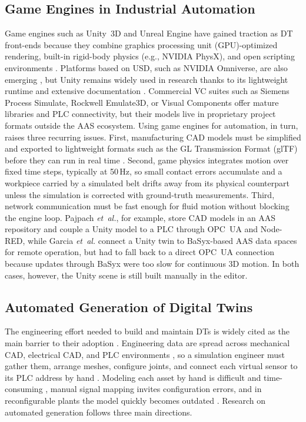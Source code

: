 \documentclass{ieeeojies}
\newcommand{\etal}{\textit{et~al.}}
\begin{document}
\subsection{Game Engines in Industrial Automation}
\label{sec:rw_game_engines}

Game engines such as Unity~3D and Unreal Engine have gained traction as DT front-ends because they combine graphics processing unit (GPU)-optimized rendering, built-in rigid-body physics (e.g., NVIDIA PhysX), and open scripting environments \cite{Zheng2024,Pajpach2022,Garcia2025}. Platforms based on USD, such as NVIDIA Omniverse, are also emerging \cite{Dong2024}, but Unity remains widely used in research thanks to its lightweight runtime and extensive documentation \cite{Alexopoulos2025,Pajpach2023}. Commercial VC suites such as Siemens Process Simulate, Rockwell Emulate3D, or Visual Components offer mature libraries and PLC connectivity, but their models live in proprietary project formats outside the AAS ecosystem. Using game engines for automation, in turn, raises three recurring issues. First, manufacturing CAD models must be simplified and exported to lightweight formats such as the GL Transmission Format (glTF) before they can run in real time \cite{Chowdhury2025,Striffler2023}. Second, game physics integrates motion over fixed time steps, typically at 50\,Hz, so small contact errors accumulate and a workpiece carried by a simulated belt drifts away from its physical counterpart unless the simulation is corrected with ground-truth measurements. Third, network communication must be fast enough for fluid motion without blocking the engine loop. Pajpach \etal \cite{Pajpach2023}, for example, store CAD models in an AAS repository and couple a Unity model to a PLC through OPC~UA and Node-RED, while Garcia \etal \cite{Garcia2025} connect a Unity twin to BaSyx-based AAS data spaces for remote operation, but had to fall back to a direct OPC~UA connection because updates through BaSyx were too slow for continuous 3D motion. In both cases, however, the Unity scene is still built manually in the editor.

\subsection{Automated Generation of Digital Twins}
\label{sec:rw_automated_generation}

The engineering effort needed to build and maintain DTs is widely cited as the main barrier to their adoption \cite{Kritzinger2018,Moyne2020,Khan2025}. Engineering data are spread across mechanical CAD, electrical CAD, and PLC environments \cite{Schaper2025}, so a simulation engineer must gather them, arrange meshes, configure joints, and connect each virtual sensor to its PLC address by hand \cite{Alexopoulos2025,Striffler2023}. Modeling each asset by hand is difficult and time-consuming \cite{Garcia2023}, manual signal mapping invites configuration errors, and in reconfigurable plants the model quickly becomes outdated \cite{Ahvanouee2025,Herzog2025}. Research on automated generation follows three main directions.
\end{document}

